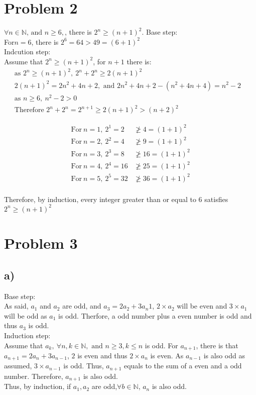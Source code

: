 \documentclass{article}
\begin{document}
\section*{Problem 2}
    \(\forall n\in \mathbb{N}\text{, and }n\geqslant 6, \), there is \(2^n\geqslant(n+1)^2\).
    Base step:\\
    For\(n=6\), there is \(2^6=64>49=(6+1)^2\) \\
    Indcution step:\\
    Assume that \(2^n\geqslant(n+1)^2\), for \(n+1\) there is:\\
    \begin{align*}
        \text{as  } 2^n\geqslant(n+1)^2,\  2^n+2^n\geqslant 2(n+1)^2&\\
        2(n+1)^2=2n^2+4n+2, \text{ and } 2n^2+4n+2-(n^2+4n+4)=n^2-2\\
        \text{as }n\geqslant 6,\ n^2-2>0\\
        \text {Therefore }  2^n+2^n=2^{n+1}\geqslant2(n+1)^2>(n+2)^2
    \end{align*}
    
    \begin{align*}
        \text {For}\ n=1, \ 2^1=2&\ngeq 4=(1+1)^2\\
        \text {For}\ n=2, \ 2^2=4&\ngeq 9=(1+1)^2\\
        \text {For}\ n=3, \ 2^3=8&\ngeq 16=(1+1)^2\\
        \text {For}\ n=4, \ 2^4=16&\ngeq 25=(1+1)^2\\
        \text {For}\ n=5, \ 2^5=32&\ngeq 36=(1+1)^2\\
    \end{align*}
    
    Therefore, by induction, every integer greater than or equal to 6 satisfies \(2^n\geqslant(n+1)^2\)
\section*{Problem 3}
    \subsection*{a)}
        Base step:\\
        As said, \(a_1\) and \(a_2\) are odd, and \(a_3=2a_{2}+3a_n{1}\), \(2\times a_{2}\) will be even and \(3 \times a_1\) will be odd as \(a_1\) is odd.
        Therfore, a odd number plus a even number is odd and thus \(a_3\) is odd.\\
        Induction step:\\
        Assume that \(a_k,\ \forall n,k\in \mathbb{N}, \text{ and } n\geqslant 3, k\leqslant n\) is odd. For \(a_{n+1}\),
        there is that \(a_{n+1}=2a_n+3a_{n-1}\), \(2\) is even and thus \(2\times a_{n}\) is even. As
        \(a_{n-1}\) is also odd as assumed, \(3\times a_{n-1}\) is odd. Thus, \(a_{n+1}\) equals to the sum
        of a even and a odd number. Therefore, \(a_{n+1}\) is also odd.\\
        Thus, by induction, if \(a_1,a_2\) are odd,\(\forall b\in \mathbb{N}\), \(a_n\) is also odd.
    \newpage
\end{document}
